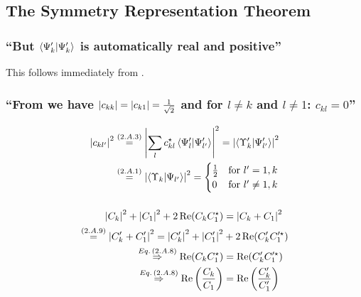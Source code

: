 \subsection{The Symmetry Representation Theorem}\label{susec:2_A}

\subsubsection{\enquote{But $\innerproduct{\Psi_k^\prime}{\Psi_k^\prime}$ is automatically \textbf{real and positive}} }
This follows immediately from .

\subsubsection{\enquote{From  we have $\abs{c_{kk}}=\abs{c_{k1}}=\frac{1}{\sqrt{2}}$ and for $l\neq k$ and $l\neq 1$: $c_{kl}=0$} }

\begin{align*}
	\abs{c_{kl^\prime}}^2&\overset{\eqc{2.A.3}}{=}\abs{\sum\limits_{l}c_{kl}^\star \innerproduct{\Psi_l^\prime}{\Psi_{l^\prime}^\prime}}^2=\abs{\innerproduct{\Upsilon_k^\prime}{\Psi_{l^\prime}^\prime}}^2\\
	&\overset{\eqc{2.A.1}}{=}\abs{\innerproduct{\Upsilon_k}{\Psi_{l^\prime}}}^2=\begin{cases}
		\frac{1}{2} &\text{for } l^\prime=1,k\\
		0&\text{for } l^\prime\neq1,k\end{cases}
\end{align*}

\subsubsection{ }
\begin{align*} 
	\abs{C_k}^2+\abs{C_1}^2+2\Re(C_k C_1^\star)&=\abs{C_k+C_1}^2\\
	\overset{({2.A.9})}{=}\abs{C_k^\prime+C_1^\prime}^2=\abs{C_k^\prime}^2+\abs{C_1^\prime}^2&+2\Re(C_k^\prime C_1^{\prime\star})\\
	\overset{Eq.\,({2.A.8})}{\Rightarrow} \Re(C_k C_1^\star)&=\Re(C_k^\prime C_1^{\prime\star})\\
	\overset{Eq.\,({2.A.8})}{\Rightarrow} \Re\left(\dfrac{C_k}{C_1}\right)&=\Re\left(\dfrac{C_k^\prime}{C_1^\prime}\right)
\end{align*}

